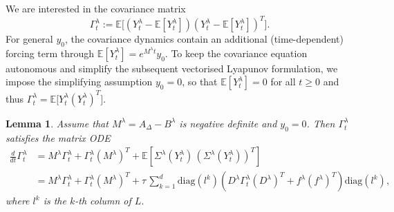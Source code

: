 \documentclass[10pt]{amsart}
\newtheorem{lemma}[theorem]{Lemma}
\numberwithin{equation}{section}
\begin{document}
We are interested in the covariance matrix
$$
\Gamma_t^\lambda := \mathbb{E}\bigl[(Y_t^\lambda-\mathbb{E}[Y_t^\lambda]) (Y_t^\lambda-\mathbb{E}[Y_t^\lambda])^T\bigr].
$$
For general $y_0$, the covariance dynamics contain an additional (time-dependent) forcing term through $\mathbb{E}[Y_t^\lambda]=e^{M^\lambda t}y_0$.
To keep the covariance equation autonomous and simplify the subsequent vectorised Lyapunov formulation, we
impose the simplifying assumption $y_0=0$, so that $\mathbb{E}[Y_t^\lambda]=0$ for all $t\geq 0$ and thus
$
\Gamma_t^\lambda=\mathbb{E}\bigl[Y_t^\lambda (Y_t^\lambda)^T\bigr].
$
\begin{lemma}
    Assume that $M^\lambda = A_\Delta -B^\lambda$ is negative definite and $y_0 = 0$. Then $ \Gamma_t^\lambda$ satisfies the matrix ODE
    \begin{equation*}
            \begin{split}
                 \frac{d}{dt} \Gamma_t^\lambda &= M^\lambda \Gamma_t^\lambda + \Gamma_t^\lambda (M^\lambda)^T
+ \mathbb{E}\!\left[\Sigma^\lambda(Y_t^\lambda)\,(\Sigma^\lambda(Y_t^\lambda))^T\right]\\
                 & = M ^\lambda \Gamma_t^\lambda + \Gamma_t^\lambda (M^\lambda)^T + \tau \, \sum_{k=1}^d \mathrm{diag}(l^k) (D^\lambda \Gamma_t^\lambda (D^\lambda)^T + f^\lambda (f^\lambda)^T) \mathrm{diag} (l^k),
            \end{split}
        \end{equation*}
        where $l^k$ is the $k$-th column of $L.$
\end{lemma}
\end{document}
